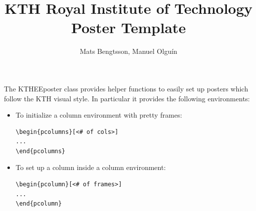 \documentclass[portrait, a0]{KTHEEposter}
\begin{document}
    
    \title{KTH Royal Institute of Technology\\Poster Template}
    
    \author{Mats Bengtsson, Manuel Olguín}
    \maketitle

    \begin{pcolumns}[3] %
        \begin{pcolumn}[4] %
            \begin{pframe}[1.15] %
                The KTHEEposter class provides helper functions to easily set up posters which follow the KTH visual style.
                In particular it provides the following environments:
                \begin{itemize}
                    \item To initialize a column environment with pretty frames:
                    \begin{lstlisting}
\begin{pcolumns}[<# of cols>]
... 
\end{pcolumns}
                    \end{lstlisting}
                    
                    \item To set up a column inside a column environment:
                    \begin{lstlisting}
\begin{pcolumn}[<# of frames>]
...
\end{pcolumn}
                    \end{lstlisting}
                

\end{itemize}
\end{pframe}
\end{pcolumn}
\end{pcolumns}
\end{document}

